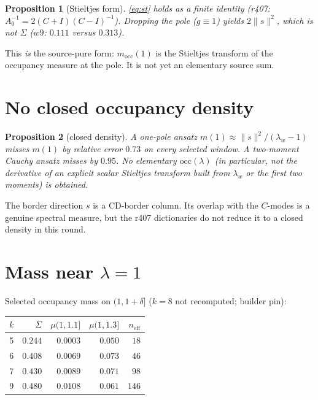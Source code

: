 \documentclass[11pt]{article}
\newtheorem{prop}{Proposition}
\theoremstyle{remark}
\begin{document}
\begin{prop}[Stieltjes form]\label{prop:st}
\eqref{eq:st} holds as a finite identity
(r407: $A_{0}^{-1}=2(C+I)(C-I)^{-1}$).
Dropping the pole ($g\equiv 1$) yields
$2\|s\|^{2}$, which is not $\Sigma$
($w9$: $0.111$ versus $0.313$).
\end{prop}

This \emph{is} the source-pure form: $m_{\mathrm{occ}}(1)$
is the Stieltjes transform of the occupancy measure
at the pole.
It is not yet an elementary source sum.

\section{No closed occupancy density}\label{sec:dens}

\begin{prop}[closed density]\label{prop:dens}
A one-pole ansatz $m(1)\approx\|s\|^{2}/(\lambda_w-1)$
misses $m(1)$ by relative error $0.73$ on every
selected window.
A two-moment Cauchy ansatz misses by $0.95$.
No elementary $\mathrm{occ}(\lambda)$
(in particular, not the derivative of an
explicit scalar Stieltjes transform built from
$\lambda_w$ or the first two moments) is obtained.
\end{prop}

The border direction $s$ is a CD-border column.
Its overlap with the $C$-modes is a genuine
spectral measure, but the r407 dictionaries do
not reduce it to a closed density in this round.

\section{Mass near $\lambda=1$}\label{sec:near}

Selected occupancy mass on $(1,1+\delta]$
($k=8$ not recomputed; builder pin):

\begin{center}
\begin{tabular}{rrrrr}
\toprule
$k$ & $\Sigma$ & $\mu(1,1.1]$ & $\mu(1,1.3]$ & $n_{\mathrm{eff}}$ \\
\midrule
5 & $0.244$ & $0.0003$ & $0.050$ & $18$ \\
6 & $0.408$ & $0.0069$ & $0.073$ & $46$ \\
7 & $0.430$ & $0.0089$ & $0.071$ & $98$ \\
9 & $0.480$ & $0.0108$ & $0.061$ & $146$ \\
\bottomrule
\end{tabular}
\end{center}
\end{document}

